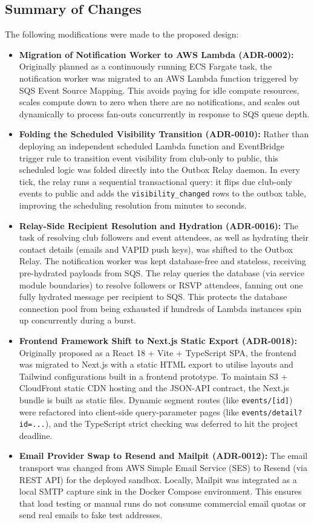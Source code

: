 \subsection{Summary of Changes}
The following modifications were made to the proposed design:
\begin{itemize}
    \item \textbf{Migration of Notification Worker to AWS Lambda (ADR-0002):} Originally planned as a continuously running ECS Fargate task, the notification worker was migrated to an AWS Lambda function triggered by SQS Event Source Mapping. This avoids paying for idle compute resources, scales compute down to zero when there are no notifications, and scales out dynamically to process fan-outs concurrently in response to SQS queue depth.
    \item \textbf{Folding the Scheduled Visibility Transition (ADR-0010):} Rather than deploying an independent scheduled Lambda function and EventBridge trigger rule to transition event visibility from club-only to public, this scheduled logic was folded directly into the Outbox Relay daemon. In every tick, the relay runs a sequential transactional query: it flips due club-only events to public and adds the \texttt{visibility\_changed} rows to the outbox table, improving the scheduling resolution from minutes to seconds.
    \item \textbf{Relay-Side Recipient Resolution and Hydration (ADR-0016):} The task of resolving club followers and event attendees, as well as hydrating their contact details (emails and VAPID push keys), was shifted to the Outbox Relay. The notification worker was kept database-free and stateless, receiving pre-hydrated payloads from SQS. The relay queries the database (via service module boundaries) to resolve followers or RSVP attendees, fanning out one fully hydrated message per recipient to SQS. This protects the database connection pool from being exhausted if hundreds of Lambda instances spin up concurrently during a burst.
    \item \textbf{Frontend Framework Shift to Next.js Static Export (ADR-0018):} Originally proposed as a React 18 + Vite + TypeScript SPA, the frontend was migrated to Next.js with a static HTML export to utilise layouts and Tailwind configurations built in a frontend prototype. To maintain S3 + CloudFront static CDN hosting and the JSON-API contract, the Next.js bundle is built as static files. Dynamic segment routes (like \texttt{events/[id]}) were refactored into client-side query-parameter pages (like \texttt{events/detail?id=...}), and the TypeScript strict checking was deferred to hit the project deadline.
    \item \textbf{Email Provider Swap to Resend and Mailpit (ADR-0012):} The email transport was changed from AWS Simple Email Service (SES) to Resend (via REST API) for the deployed sandbox. Locally, Mailpit was integrated as a local SMTP capture sink in the Docker Compose environment. This ensures that load testing or manual runs do not consume commercial email quotas or send real emails to fake test addresses.
\end{itemize}


